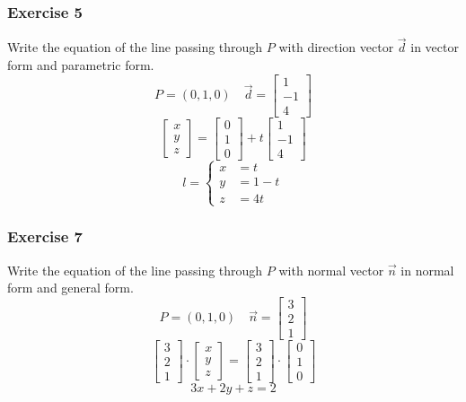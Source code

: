 \documentclass{math}
\begin{document}
\subsubsection*{Exercise 5}
Write the equation of the line passing through \( P \) with direction vector
\( \vec{d} \) in vector form and parametric form.
\[ P = (0,1,0) \quad \vec{d} = \begin{bmatrix}1 \\ -1 \\ 4\end{bmatrix} \]
\[ \begin{bmatrix}x \\ y \\ z\end{bmatrix} =
  \begin{bmatrix}0 \\ 1 \\ 0\end{bmatrix}+
  t\begin{bmatrix}1 \\ -1 \\ 4\end{bmatrix} \]
\[ l = \begin{cases}
  x &= t \\
  y &= 1-t \\
  z &= 4t
\end{cases} \]

\subsubsection*{Exercise 7}
Write the equation of the line passing through \( P \) with normal vector
\( \vec{n} \) in normal form and general form.
\[ P = (0,1,0) \quad \vec{n} = \begin{bmatrix}3 \\ 2 \\ 1\end{bmatrix} \]
\[ \begin{bmatrix}3 \\ 2 \\ 1\end{bmatrix}\cdot
  \begin{bmatrix}x \\ y \\ z\end{bmatrix} =
  \begin{bmatrix}3 \\ 2 \\ 1\end{bmatrix}\cdot
  \begin{bmatrix}0 \\ 1 \\ 0\end{bmatrix} \]
\[ 3x+2y+z = 2 \]
\end{document}
